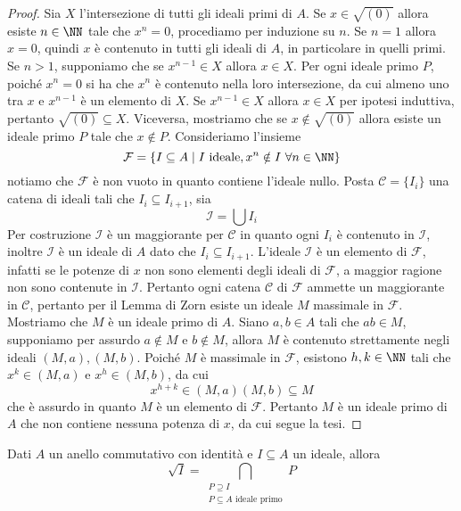 \documentclass[11pt]{scrartcl}
\begin{document}
	\begin{proof}
		Sia $X$ l'intersezione di tutti gli ideali primi di $A$. 
		Se $x \in \sqrt{(0)}$ allora esiste $n \in \NN$ tale che $x^n = 0$, procediamo
		per induzione su $n$. Se $n = 1$ allora $x = 0$, quindi $x$ è contenuto 
		in tutti gli ideali di $A$, in particolare in quelli primi. Se $n > 1$, 
		supponiamo che se $x^{n - 1} \in X$ allora $x \in X$.
		Per ogni ideale primo $P$, poiché $x^n = 0$ si ha che $x^n$ è contenuto nella
		loro intersezione, da cui almeno uno tra $x$ e $x^{n - 1}$ è un elemento
		di $X$. Se $x^{n - 1} \in X$ allora $x \in X$ per ipotesi induttiva, pertanto 
		$\sqrt{(0)} \subseteq X$. Viceversa, mostriamo che se $x \notin \sqrt{(0)}$
		allora esiste un ideale primo $P$ tale che $x \notin P$. Consideriamo 
		l'insieme
		\[
		\mathcal{F} = \{I \subseteq A \mid I \text{ ideale}, x^n \notin I
		~\forall n \in \NN\}
		\]
		notiamo che $\mathcal{F}$ è non vuoto in quanto contiene l'ideale nullo.
		Posta $\mathscr{C} = \{I_i\}$ una catena di ideali tali che $I_i \subseteq I_{i + 1}$,
		sia
		\[
		\mathcal{I} = \bigcup I_i
		\]
		Per costruzione $\mathcal{I}$ è un maggiorante per $\mathscr{C}$ in quanto
		ogni $I_i$ è contenuto in $\mathcal{I}$, inoltre $\mathcal{I}$
		è un ideale di $A$ dato che $I_i \subseteq I_{i + 1}$. L'ideale $\mathcal{I}$
		è un elemento di $\mathcal{F}$, infatti se le potenze di $x$ non sono elementi
		degli ideali di $\mathcal{F}$, a maggior ragione non sono contenute in $\mathcal{I}$.
		Pertanto ogni catena $\mathscr{C}$ di $\mathcal{F}$ ammette un maggiorante 
		in $\mathscr{C}$, pertanto per il Lemma di Zorn esiste un ideale $M$ massimale
		in $\mathcal{F}$. Mostriamo che $M$ è un ideale primo di $A$. Siano $a, b \in A$
		tali che $ab \in M$, supponiamo per assurdo $a \notin M$ e $b \notin M$,
		allora $M$ è contenuto strettamente negli ideali $(M, a), (M, b)$. Poiché
		$M$ è massimale in $\mathcal{F}$, esistono $h, k \in \NN$ tali che $x^k \in (M, a)$
		e $x^h \in (M, b)$, da cui
		\[
		x^{h + k} \in (M, a)(M, b) \subseteq M
		\]
		che è assurdo in quanto $M$ è un elemento di $\mathcal{F}$. Pertanto 
		$M$ è un ideale primo di $A$ che non contiene nessuna potenza di $x$, 
		da cui segue la tesi.
	\end{proof}
	
	\begin{corollary}
		Dati $A$ un anello commutativo con identità e $I\subseteq A$ un ideale, 
		allora
		\[
		\sqrt{I} = \bigcap_{\substack{P\supseteq I\\ P \subseteq A\text{ ideale primo}}}P
		\]
	\end{corollary}
	
\end{document}
